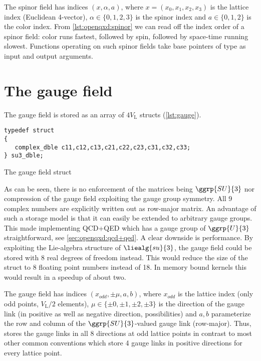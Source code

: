 The spinor field has indices $(x, \alpha, a)$, where $x=(x_0,x_1,x_2,x_3)$ is the lattice index (Euclidean 4-vector), $\alpha \in \{0,1,2,3\}$ is the spinor index and $a \in \{0,1,2\}$ is the color index.
From \cref{lst:openqxd:spinor} we can read off the index order of a spinor field: color runs fastest, followed by spin, followed by space-time running slowest.
Functions operating on such spinor fields take base pointers of type  as input and output arguments.

\section{The gauge field}
\label{sec:openqxd:gauge:field}

The gauge field is stored as an array of $4V_\mathrm{L}$  structs (\cref{lst:gauge}).
\begin{codelisting}
\begin{verbatim}
typedef struct
{
   complex_dble c11,c12,c13,c21,c22,c23,c31,c32,c33;
} su3_dble;
\end{verbatim}
\caption{The gauge field struct}
\label{lst:gauge}
\end{codelisting}
As can be seen, there is no enforcement of the matrices being $\ggrp{SU}{3}$ nor compression of the gauge field exploiting the gauge group symmetry. All \num{9} complex numbers are explicitly written out as row-major matrix. An advantage of such a storage model is that it can easily be extended to arbitrary gauge groups. This made implementing QCD+QED which has a gauge group of $\ggrp{U}{3}$ straightforward, see \cref{sec:openqxd:qcd+qed}. A clear downside is performance. By exploiting the Lie-algebra structure of $\liealg{su}{3}$, the gauge field could be stored with \num{8} real degrees of freedom instead. This would reduce the size of the struct to \num{8} floating point numbers instead of \num{18}. In memory bound kernels this would result in a speedup of about two.

The gauge field has indices $(x_{odd}, \pm \mu, a, b)$, where $x_{odd}$ is the lattice index (only odd points, $V_\mathrm{L}/2$ elements), $\mu \in \{\pm 0, \pm 1, \pm 2, \pm 3\}$ is the direction of the gauge link (in positive as well as negative direction,  possibilities) and $a,b$ parameterize the row and column of the $\ggrp{SU}{3}$-valued gauge link (row-major).
Thus, \openqxd stores the gauge links in all \num{8} directions at odd lattice points in contrast to most other common conventions which store \num{4} gauge links in positive directions for every lattice point.

